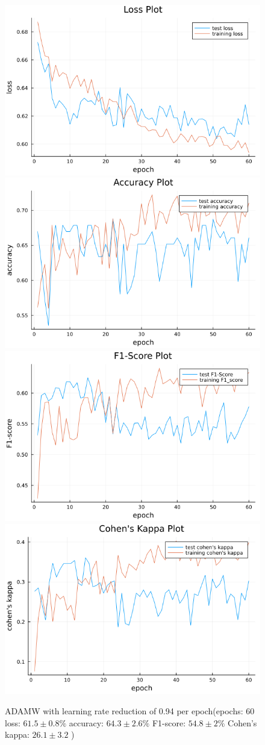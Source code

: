\documentclass[
a4paper, 
12pt,
grayscalebody, %
abstract=on,
twoside, BCOR10mm, 12pt, DIV13,headinclude, footexclude, final, abstracton, openright
]{ibireprt}
\numberwithin{equation}{chapter}
\numberwithin{table}{chapter}
\numberwithin{figure}{chapter}
\numberwithin{algorithm}{chapter}
\numberwithin{example}{chapter}
\numberwithin{example}{chapter}
\begin{document}
\begin{figure}[h]
	\includegraphics[width=0.4\linewidth]{loss_png_11_3.png}\hfill
	\includegraphics[width=0.4\linewidth]{accuracy_png_11_3.png}
	\\[\smallskipamount]
	\includegraphics[width=0.4\linewidth]{f1_score_png_11_3.png}\hfill
	\includegraphics[width=0.4\linewidth]{cohens_kappa_png_11_3.png}
	\caption{ADAMW with learning rate reduction of 0.94 per epoch(epochs: 60 loss: $61.5\pm0.8\% $ accuracy: $64.3\pm2.6\%$ F1-score: $54.8\pm2\%$  Cohen's kappa: $26.1\pm3.2$ )}
\end{figure}%
\end{document}
